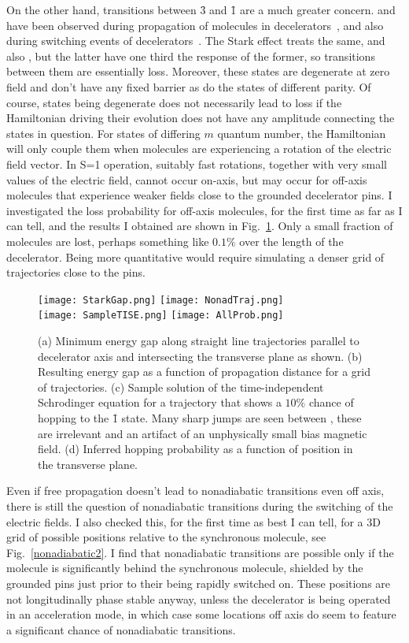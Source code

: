On the other hand, transitions between \f3 and \f1 are a much greater concern. and have been observed during propagation of molecules in decelerators~\cite{Meek2011}, and also during switching events of decelerators~\cite{Wall2010}.
The Stark effect treats  the same, and also , but the latter have one third the response of the former, so transitions between them are essentially loss.
Moreover, these states are degenerate at zero field and don't have any fixed barrier as do the states of different parity.
Of course, states being degenerate does not necessarily lead to loss if the Hamiltonian driving their evolution does not have any amplitude connecting the states in question.
For states of differing $m$ quantum number, the Hamiltonian will only couple them when molecules are experiencing a rotation of the electric field vector.
In S=1 operation, suitably fast rotations, together with very small values of the electric field, cannot occur on-axis, but may occur for off-axis molecules that experience weaker fields close to the grounded decelerator pins.
I investigated the loss probability for off-axis molecules, for the first time as far as I can tell, and the results I obtained are shown in Fig.~\ref{nonadiabatic1}.
Only a small fraction of molecules are lost, perhaps something like $0.1\%$ over the length of the decelerator.
Being more quantitative would require simulating a denser grid of trajectories close to the pins.

\begin{figure}[t!]
\centering
\texttt{[image: StarkGap.png]}
\texttt{[image: NonadTraj.png]}\\
\texttt{[image: SampleTISE.png]}
\texttt{[image: AllProb.png]}
\caption[Non-adiabatic Transitions Off-Axis]{\label{nonadiabatic1}
(a) Minimum energy gap along straight line trajectories parallel to decelerator axis and intersecting the transverse plane as shown. (b) Resulting energy gap as a function of propagation distance for a grid of trajectories. (c) Sample solution of the time-independent Schr\:odinger equation for a trajectory that shows a $10\%$ chance of hopping to the \f1 state. Many sharp jumps are seen between , these are irrelevant and an artifact of an unphysically small bias magnetic field. (d) Inferred hopping probability as a function of position in the transverse plane.
}
\end{figure}

Even if free propagation doesn't lead to nonadiabatic transitions even off axis, there is still the question of nonadiabatic transitions during the switching of the electric fields.
I also checked this, for the first time as best I can tell, for a 3D grid of possible positions relative to the synchronous molecule, see Fig.~\ref{nonadiabatic2}.
I find that nonadiabatic transitions are possible only if the molecule is significantly behind the synchronous molecule, shielded by the grounded pins just prior to their being rapidly switched on.
These positions are not longitudinally phase stable anyway, unless the decelerator is being operated in an acceleration mode, in which case some locations off axis do seem to feature a significant chance of nonadiabatic transitions.

